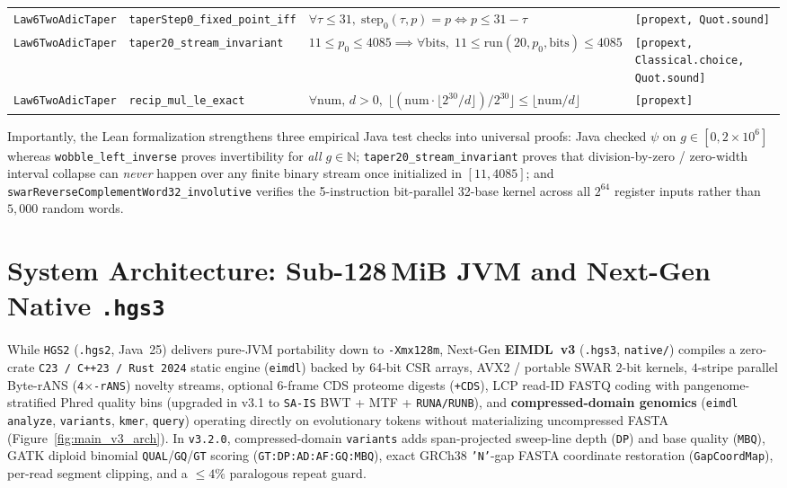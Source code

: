 \documentclass[10pt]{article}
\begin{document}
\begin{table}[h!]
{\begin{tabular}{llll}
\texttt{Law6TwoAdicTaper} & \texttt{taperStep0\_fixed\_point\_iff} & $\forall \tau \le 31,\; \text{step}_0(\tau, p)=p \iff p \le 31-\tau$ & \texttt{[propext, Quot.sound]} \\
\texttt{Law6TwoAdicTaper} & \texttt{taper20\_stream\_invariant} & $11 \le p_0 \le 4085 \implies \forall \text{bits},\; 11 \le \text{run}(20, p_0, \text{bits}) \le 4085$ & \texttt{[propext, Classical.choice, Quot.sound]} \\
\texttt{Law6TwoAdicTaper} & \texttt{recip\_mul\_le\_exact} & $\forall \text{num},\, d>0,\; \lfloor (\text{num} \cdot \lfloor 2^{30}/d \rfloor)/2^{30} \rfloor \le \lfloor \text{num}/d \rfloor$ & \texttt{[propext]} \\
\bottomrule
\end{tabular}%
}
\end{table}

Importantly, the Lean formalization strengthens three empirical Java test checks into universal proofs: Java checked $\psi$ on $g \in [0, 2\times 10^6]$ whereas \texttt{wobble\_left\_inverse} proves invertibility for \emph{all} $g \in \mathbb{N}$; \texttt{taper20\_stream\_invariant} proves that division-by-zero / zero-width interval collapse can \emph{never} happen over any finite binary stream once initialized in $[11, 4085]$; and \texttt{swarReverseComplementWord32\_involutive} verifies the 5-instruction bit-parallel 32-base kernel across all $2^{64}$ register inputs rather than $5,000$ random words.

\section{System Architecture: Sub-128\,MiB JVM and Next-Gen Native \texttt{.hgs3}}

While \texttt{HGS2} (\texttt{.hgs2}, Java~25) delivers pure-JVM portability down to \texttt{-Xmx128m}, Next-Gen \textbf{EIMDL~v3} (\texttt{.hgs3}, \texttt{native/}) compiles a zero-crate \texttt{C23 / C++23 / Rust~2024} static engine (\texttt{eimdl}) backed by 64-bit CSR arrays, AVX2 / portable SWAR $2$-bit kernels, $4$-stripe parallel Byte-rANS (\texttt{4$\times$-rANS}) novelty streams, optional 6-frame CDS proteome digests (\texttt{+CDS}), LCP read-ID FASTQ coding with pangenome-stratified Phred quality bins (upgraded in v3.1 to \texttt{SA-IS} BWT + MTF + \texttt{RUNA/RUNB}), and \textbf{compressed-domain genomics} (\texttt{eimdl analyze}, \texttt{variants}, \texttt{kmer}, \texttt{query}) operating directly on evolutionary tokens without materializing uncompressed FASTA (Figure~\ref{fig:main_v3_arch}). In \texttt{v3.2.0}, compressed-domain \texttt{variants} adds span-projected sweep-line depth (\texttt{DP}) and base quality (\texttt{MBQ}), GATK diploid binomial \texttt{QUAL}/\texttt{GQ}/\texttt{GT} scoring (\texttt{GT:DP:AD:AF:GQ:MBQ}), exact GRCh38 \texttt{'N'}-gap FASTA coordinate restoration (\texttt{GapCoordMap}), per-read segment clipping, and a $\le 4\%$ paralogous repeat guard.
\end{document}
